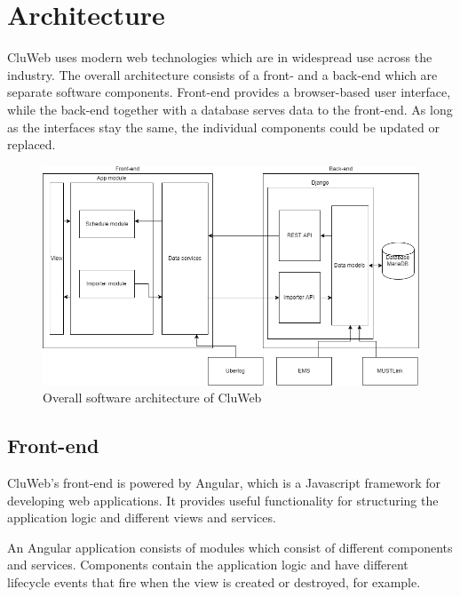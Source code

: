 \section{Architecture}
CluWeb uses modern web technologies which are in widespread use across the industry. The overall architecture consists of a front- and a back-end which are separate software components. Front-end provides a browser-based user interface, while the back-end together with a database serves data to the front-end. As long as the interfaces stay the same, the individual components could be updated or replaced.

\begin{figure}[ht]
  \begin{center}
    \includegraphics*[width=1\textwidth]{architecture}
  \end{center}
  \caption{Overall software architecture of CluWeb}
  \label{fig:cluweb_architecture}
\end{figure}

\subsection{Front-end}
CluWeb's front-end is powered by Angular, which is a Javascript framework for developing web applications. It provides useful functionality for structuring the application logic and different views and services.

An Angular application consists of modules which consist of different components and services. Components contain the application logic and have different lifecycle events that fire when the view is created or destroyed, for example.

